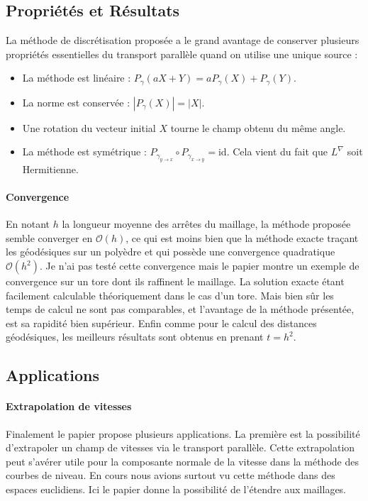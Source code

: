 \documentclass[11pt]{article}
\begin{document}
	\subsection{Propriétés et Résultats}
	
	La méthode de discrétisation proposée a le grand avantage de conserver plusieurs propriétés essentielles du transport parallèle quand on utilise une unique source :
	\begin{itemize}
		\item La méthode est linéaire : $P_\gamma \left( a X + Y \right) = a P_\gamma(X) + P_\gamma(Y)$.
		\item La norme est conservée : $| P_\gamma(X) | = | X |$.
		\item Une rotation du vecteur initial $X$ tourne le champ obtenu du même angle.
		\item La méthode est symétrique : $P_{\gamma_{y \rightarrow x}} \circ P_{\gamma_{x \rightarrow y}} = \text{id}$. Cela vient du fait que $L^\nabla$ soit Hermitienne.
	\end{itemize}
	
	\paragraph{Convergence}
	En notant $h$ la longueur moyenne des arrêtes du maillage, la méthode proposée semble converger en $\mathcal{O}(h)$, ce qui est moins bien que la méthode exacte traçant les géodésiques sur un polyèdre et qui possède une convergence quadratique $\mathcal{O}(h^2)$. Je n'ai pas testé cette convergence mais le papier montre un exemple de convergence sur un tore dont ils raffinent le maillage. La solution exacte étant facilement calculable théoriquement dans le cas d'un tore. Mais bien sûr les temps de calcul ne sont pas comparables, et l'avantage de la méthode présentée, est sa rapidité bien supérieur. Enfin comme pour le calcul des distances géodésiques, les meilleurs résultats sont obtenus en prenant $t = h^2$.
	
	\subsection{Applications}
	
	\paragraph{Extrapolation de vitesses}
	Finalement le papier propose plusieurs applications. La première est la possibilité d'extrapoler un champ de vitesses via le transport parallèle. Cette extrapolation peut s'avérer utile pour la composante normale de la vitesse dans la méthode des courbes de niveau. En cours nous avions surtout vu cette méthode dans des espaces euclidiens. Ici le papier donne la possibilité de l'étendre aux maillages.
	
\end{document}
